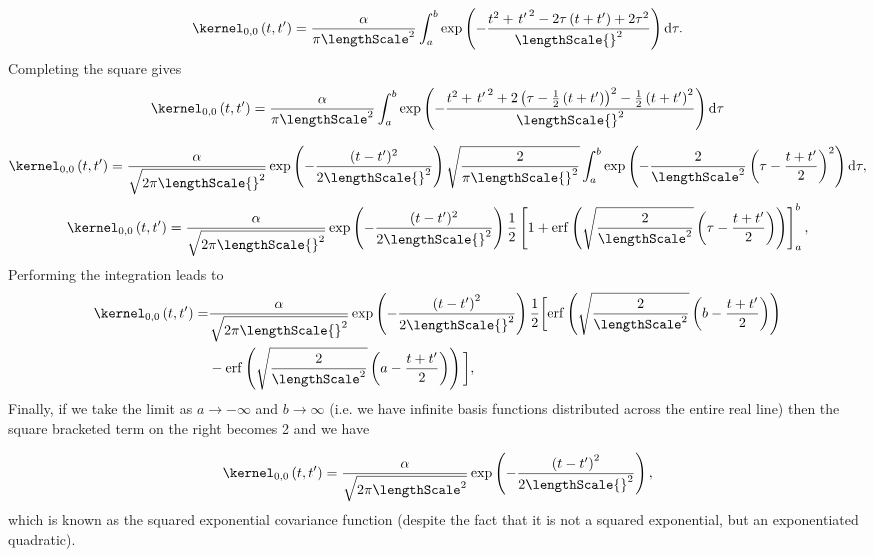 \documentclass{article}
\begin{document}
\[
\kernel_{0,0}\left(t,t^\prime\right) = \frac{\alpha}{\pi \lengthScale^2}
\int_a^b \exp\left( -\frac{t^2 + \left.t^\prime\right.^2 - 2\tau
    \left(t+t^\prime\right) + 2\tau^2}{\lengthScale{}^2}
\right)\mathrm{d}\tau.
\]
Completing the square gives
\[
\kernel_{0,0}\left(t,t^\prime\right) = \frac{\alpha}{\pi \lengthScale^2}
\int_a^b \exp\left( -\frac{t^2 + \left.t^\prime\right.^2 + 2\left(\tau
      - \frac{1}{2}\left(t + t^\prime\right)\right)^2
    -\frac{1}{2}\left(t + t^\prime\right)^2}{\lengthScale{}^2}
\right)\mathrm{d}\tau
\]


\[
\kernel_{0,0}\left(t,t^\prime\right) =
\frac{\alpha}{\sqrt{2\pi\lengthScale{}^2}} \exp\left(
  -\frac{(t-t^\prime)^2}{2\lengthScale{}^2}\right) \sqrt{\frac{2}{\pi
    \lengthScale{}^2}}\int_a^b
\exp\left(-\frac{2}{\lengthScale^2}\left(\tau - \frac{t +
      t^\prime}{2}\right)^2 \right)\mathrm{d}\tau,
\]
\[
\kernel_{0,0}\left(t,t^\prime\right) =
\frac{\alpha}{\sqrt{2\pi\lengthScale{}^2}} \exp\left(
  -\frac{(t-t^\prime)^2}{2\lengthScale{}^2}\right)
\frac{1}{2}\left[1+\mathrm{erf}\left(\sqrt{\frac{2}{\lengthScale^2}}\left(\tau
      - \frac{t + t^\prime}{2}\right) \right)\right]_a^b,
\]
Performing the integration leads to 
\begin{align*}
\kernel_{0,0}\left(t,t^\prime\right) = &
\frac{\alpha}{\sqrt{2\pi\lengthScale{}^2}} \exp\left(
  -\frac{\left(t-t^\prime\right)^2}{2\lengthScale{}^2}\right)
\frac{1}{2}\bigg[\mathrm{erf}\left(\sqrt{\frac{2}{\lengthScale^2}}\left(b
      - \frac{t + t^\prime}{2}\right) \right) \\ & -
  \mathrm{erf}\left(\sqrt{\frac{2}{\lengthScale^2}}\left(a - \frac{t +
        t^\prime}{2}\right) \right)\bigg],
\end{align*}
Finally, if we take the limit as $a\rightarrow -\infty$ and
$b\rightarrow \infty$ (i.e. we have infinite basis functions
distributed across the entire real line) then the square bracketed
term on the right becomes 2 and we have

\begin{equation}
\kernel_{0,0}\left(t,t^\prime\right) =
\frac{\alpha}{\sqrt{2\pi\lengthScale^2}}\exp\left(
  -\frac{\left(t-t^\prime\right)^2}{2\lengthScale{}^2}\right),
\label{eq:RBF}
\end{equation}
which is known as the squared exponential covariance function (despite the fact that it is not a squared exponential, but an exponentiated quadratic). 
\end{document}
